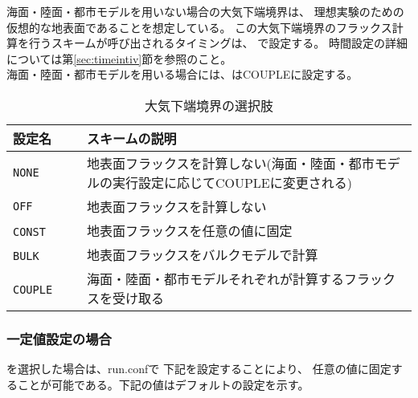 海面・陸面・都市モデルを用いない場合の大気下端境界は、
理想実験のための仮想的な地表面であることを想定している。
この大気下端境界のフラックス計算を行うスキームが呼び出されるタイミングは、
で設定する。
時間設定の詳細については第\ref{sec:timeintiv}節を参照のこと。\\

海面・陸面・都市モデルを用いる場合には、はCOUPLEに設定する。


\begin{table}[h]
\begin{center}
  \caption{大気下端境界の選択肢}
  \label{tab:nml_atm_sf}
  \begin{tabularx}{150mm}{lX} \hline
    \rowcolor[gray]{0.9}  設定名 & スキームの説明\\ \hline
      \verb|NONE|         & 地表面フラックスを計算しない(海面・陸面・都市モデルの実行設定に応じてCOUPLEに変更される) \\
      \verb|OFF|          & 地表面フラックスを計算しない \\
      \verb|CONST|   　　　& 地表面フラックスを任意の値に固定 \\
      \verb|BULK|    　　　& 地表面フラックスをバルクモデルで計算 \\
      \verb|COUPLE|  　　　& 海面・陸面・都市モデルそれぞれが計算するフラックスを受け取る \\
    \hline
  \end{tabularx}
\end{center}
\end{table}

\subsubsection{一定値設定の場合}

を選択した場合は、run.confで
下記を設定することにより、
任意の値に固定することが可能である。下記の値はデフォルトの設定を示す。\\

